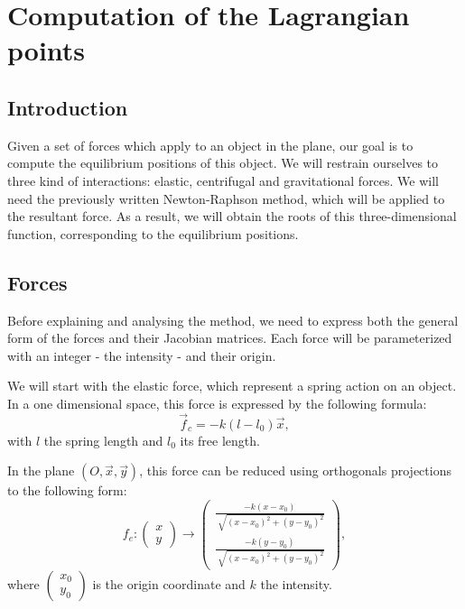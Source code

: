 
\section{Computation of the Lagrangian points}
\subsection{Introduction}
Given a set of forces which apply to an object in the plane, our goal is to compute the equilibrium positions of this object. We will restrain ourselves to three kind of interactions: elastic, centrifugal and gravitational forces. We will need the previously written Newton-Raphson method, which will be applied to the resultant force. As a result, we will obtain the roots of this three-dimensional function, corresponding to the equilibrium positions.

\subsection{Forces}
Before explaining and analysing the method, we need to express both the general form of the forces and their Jacobian matrices. Each force will be parameterized with an integer - the intensity - and their origin.

We will start with the elastic force, which represent a spring action on an object. In a one dimensional space, this force is expressed by the following formula:
\[\vec{f}_c = -k (l - l_0)\vec{x},\]
with $l$ the spring length and $l_0$ its free length.

In the plane $(O, \vec{x}, \vec{y})$, this force can be reduced using orthogonals projections to the following form:
\[f_e:\begin{pmatrix}x\\y\end{pmatrix}\rightarrow \begin{pmatrix}\frac{-k(x-x_0)}{\sqrt[]{(x-x_0)^2+(y-y_0)^2}}\\\frac{-k(y-y_0)}{\sqrt[]{(x-x_0)^2+(y-y_0)^2}}\end{pmatrix},\]
where $\begin{pmatrix}x_0\\y_0\end{pmatrix}$ is the origin coordinate and $k$ the intensity.

